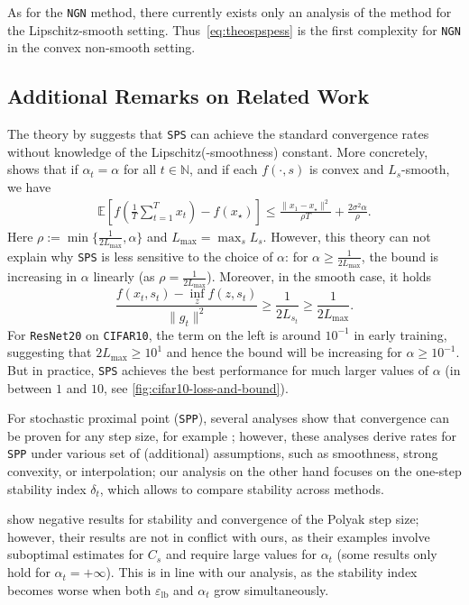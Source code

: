 \documentclass{article}
\let\temp\phi
\let\phi\varphi
\let\varphi\temp
\let\temp\varepsilon
\let\epsilon\varepsilon
\let\varepsilon\temp
\newcommand{\N}{\mathbb{N}}
\newcommand{\E}{\mathbb{E}}
\newcommand{\SPP}{{\texttt{SPP}}}
\newcommand{\SPS}{{\texttt{SPS}}}
\newcommand{\NGN}{{\texttt{NGN}}}
\theoremstyle{plain}
\theoremstyle{definition}
\theoremstyle{remark}
\begin{document}
As for the \NGN{} method, there currently exists only an analysis of the method for the Lipschitz-smooth setting. Thus~\eqref{eq:theospspess} is the first complexity for \NGN{} in the convex non-smooth setting.


\subsection{Additional Remarks on Related Work}\label{sec:app:related-work}
%
The theory by \citet{Loizou2021} suggests that \SPS{} can achieve the standard convergence rates without knowledge of the Lipschitz(-smoothness) constant.
More concretely, \citet[Thm.\ 3.4]{Loizou2021} shows that if $\alpha_t = \alpha$ for all $t\in \N$, and if each $f(\cdot,s)$ is convex and $L_s$-smooth, we have
\begin{align*}
    \E[f(\frac{1}{T}\sum_{t=1}^T x_t) - f(x_\star)] \leq \frac{\|x_1-x_\star\|^2}{\rho T} + \frac{2\sigma^2 \alpha}{\rho}.
\end{align*}
Here $\rho := \min\{\frac{1}{2L_{\max}}, \alpha\}$ and $L_{\max} = \max_s L_s$.
However, this theory can not explain why \SPS{} is less sensitive to the choice of $\alpha$: for $\alpha \geq \frac{1}{2L_{\max}}$, the bound is increasing in $\alpha$ linearly (as $\rho=\frac{1}{2L_{\max}}$). Moreover, in the smooth case, it holds 
$$\frac{f(x_t,s_t)-\inf_z f(z, s_t)}{\|g_t\|^2} \geq \frac{1}{2L_{s_t}} \geq \frac{1}{2L_{\max}}.$$
For \texttt{ResNet20} on \texttt{CIFAR10}, the term on the left is around $10^{-1}$ in early training, suggesting that $2 L_{\max} \geq 10^1$ and hence the bound will be increasing for $\alpha \geq 10^{-1}$. But in practice, \SPS{} achieves the best performance for much larger values of $\alpha$ (in between $1$ and $10$, see \cref{fig:cifar10-loss-and-bound}).

For stochastic proximal point (\SPP{}), several analyses show that convergence can be proven for any step size, for example \citet[Thm.\ 5.3, 6.4]{Tovmasyan2025}; however, these analyses derive rates for \SPP{} under various set of (additional) assumptions, such as smoothness, strong convexity, or interpolation; our analysis on the other hand focuses on the one-step stability index $\delta_t$, which allows to compare stability across methods.

\citet{Orabona2026} show negative results for stability and convergence of the Polyak step size; however, their results are not in conflict with ours, as their examples involve suboptimal estimates for $C_s$ and require large values for $\alpha_t$ (some results only hold for $\alpha_t = + \infty$). This is in line with our analysis, as the stability index becomes worse when both $\epsilon_{\text{lb}}$ and $\alpha_t$ grow simultaneously.
\end{document}
